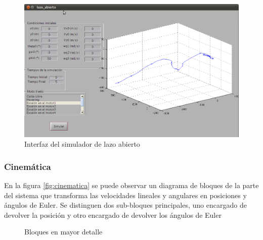 \documentclass[main]{subfiles}
\begin{document}
\begin{figure}[h!]
	\centering
	\includegraphics[width=1\textwidth]{./pics_simulador/vista.png}
	\caption{Interfaz del simulador de lazo abierto}
	\label{fig:vista}
\end{figure}
\subsubsection{Cinem\'atica}

En la figura \ref{fig:cinematica} se puede observar un diagrama de bloques de la parte del sistema que transforma las velocidades lineales y angulares en posiciones y \'angulos de Euler. Se distinguen dos sub-bloques principales, uno encargado de devolver la  posici\'on y otro encargado de devolver los \'angulos de Euler
\begin{figure} [h!]
  \centering
  \caption{Bloques en mayor detalle}
  \label{fig:bloques}
\end{figure}
\end{document}
